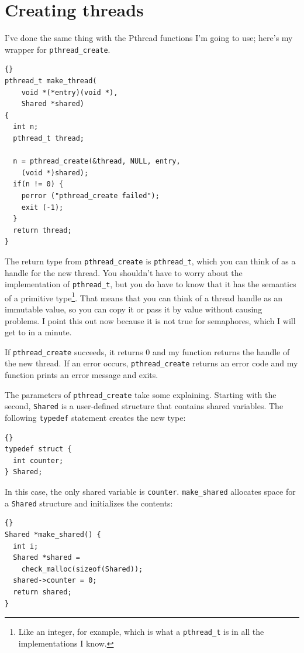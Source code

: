 \documentclass{book}
\begin{document}
\section{Creating threads}

I've done the same thing with the Pthread functions I'm going to use;
here's my wrapper for {\tt pthread\_create}.

\begin{lstlisting}[title={}]{}
pthread_t make_thread(
    void *(*entry)(void *), 
    Shared *shared) 
{
  int n;
  pthread_t thread;

  n = pthread_create(&thread, NULL, entry, 
    (void *)shared);
  if(n != 0) {
    perror ("pthread_create failed");
    exit (-1);
  }
  return thread;
}
\end{lstlisting}

The return type from {\tt pthread\_create} is {\tt pthread\_t},
which you can think of as a handle for the new thread.  You
shouldn't have to worry about the implementation of {\tt pthread\_t},
but you do have to know that it has the semantics of a primitive
type\footnote{Like an integer, for example, which is what a
        {\tt pthread\_t} is in all the implementations I know.}.  That
means that you can think of a thread handle as an immutable
value, so you can copy it or pass it by value without causing
problems.  I point this out now because it is not true for
semaphores, which I will get to in a minute.

If {\tt pthread\_create} succeeds, it returns 0 and my function
returns the handle of the new thread.
If an error occurs, {\tt pthread\_create}
returns an error code and my function prints an error message
and exits.

The parameters of {\tt pthread\_create} take some
explaining.  Starting with the second,
{\tt Shared}
is a user-defined structure that contains shared variables.
The following {\tt typedef} statement creates the new type:

\begin{lstlisting}[title={}]{}
typedef struct {
  int counter;
} Shared;
\end{lstlisting}

In this case, the only shared variable is {\tt counter}.
{\tt make\_shared} allocates
space for a {\tt Shared} structure and initializes the contents:

\begin{lstlisting}[title={}]{}
Shared *make_shared() {
  int i;
  Shared *shared = 
    check_malloc(sizeof(Shared));
  shared->counter = 0;
  return shared;
}
\end{lstlisting}
\end{document}
